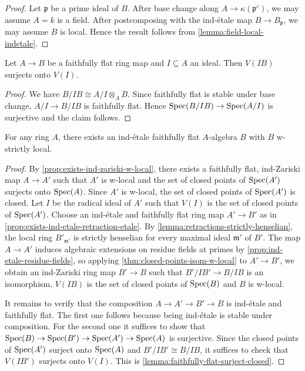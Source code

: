 \begin{proof}
    Let $\mathfrak{p}$ be a prime ideal of $B$. After base change along $A \to \kappa(\mathfrak{p}^c)$,
    we may assume $A = k$ is a field. After postcomposing with the ind-étale map $B \to B_{\mathfrak{p}}$,
    we may assume $B$ is local. Hence the result follows from \ref{lemma:field-local-indetale}.
\end{proof}

\begin{lemma}
    Let $A \to B$ be a faithfully flat ring map and $I \subseteq A$ an ideal.
    Then $V(IB)$ surjects onto $V(I)$.
    \label{lemma:faithfully-flat-surject-closed}
\end{lemma}

\begin{proof}
    We have $B / I B \cong A / I \otimes_A B$. Since faithfully flat is stable under base change,
    $A / I \to B / IB$ is faithfully flat. Hence $\mathrm{Spec}(B / IB) \to \mathrm{Spec}(A / I)$ is surjective
    and the claim follows.
\end{proof}

\begin{proposition}
    For any ring \(A\), there exists an ind-étale faithfully flat \(A\)-algebra \(B\) with \(B\) w-strictly local.
    \label{thm:ind-etale-w-strictly-local-cover}
\end{proposition}

\begin{proof}
    By \ref{prop:exists-ind-zariski-w-local}, there exists a faithfully flat, ind-Zariski map
    $A \to A'$ such that $A'$ is w-local and the set of closed points of $\mathrm{Spec}(A')$ surjects
    onto $\mathrm{Spec}(A)$. Since $A'$ is w-local, the set of closed points of $\mathrm{Spec}(A')$ is closed.
    Let $I$ be the radical ideal of $A'$ such that $V(I)$ is the set of closed points of $\mathrm{Spec}(A')$.
    Choose an ind-étale and faithfully flat ring map $A' \to B'$ as in
    \ref{prop:exists-ind-etale-retraction-etale}. By
    \ref{lemma:retractions-strictly-henselian}, the local ring $B'_{\mathfrak{m}'}$ is
    strictly henselian for every maximal ideal $\mathfrak{m}'$ of $B'$.
    The map $A \to A'$ induces algebraic extensions on residue fields at primes by
    \ref{prop:ind-etale-residue-fields},
    so applying \ref{thm:closed-points-isom-w-local} to $A' \to B'$, we obtain
    an ind-Zariski ring map $B' \to B$ such that $B'/IB' \to B/IB$ is an isomorphism,
    $V(IB)$ is the set of closed points of $\mathrm{Spec}(B)$ and $B$ is w-local.

    It remains to verify that the composition $A \to A' \to B' \to B$ is ind-étale and faithfully flat.
    The first one follows because being ind-étale is stable under composition. For the second
    one it suffices to show that $\mathrm{Spec}(B) \to \mathrm{Spec}(B') \to \mathrm{Spec}(A') \to \mathrm{Spec}(A)$ is surjective.
    Since the closed points of $\mathrm{Spec}(A')$ surject onto $\mathrm{Spec}(A)$ and $B' / IB' \cong B / I B$, it
    suffices to check that $V(IB')$ surjects onto $V(I)$. This is \ref{lemma:faithfully-flat-surject-closed}.
\end{proof}


